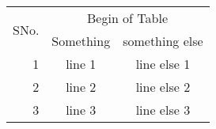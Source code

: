 \documentclass{article}
\begin{document}
\begin{tabular}{|r|c|c|}
\hline
\multirow{2}{*}{SNo.} & \multicolumn{2}{c|}{Begin of Table} \\
\cline{2-3}
& Something & something else \\
\hline
1 & line 1 & line else 1 \\
2 & line 2 & line else 2 \\
3 & line 3 & line else 3 \\
\hline
\end{tabular}
\end{document}
